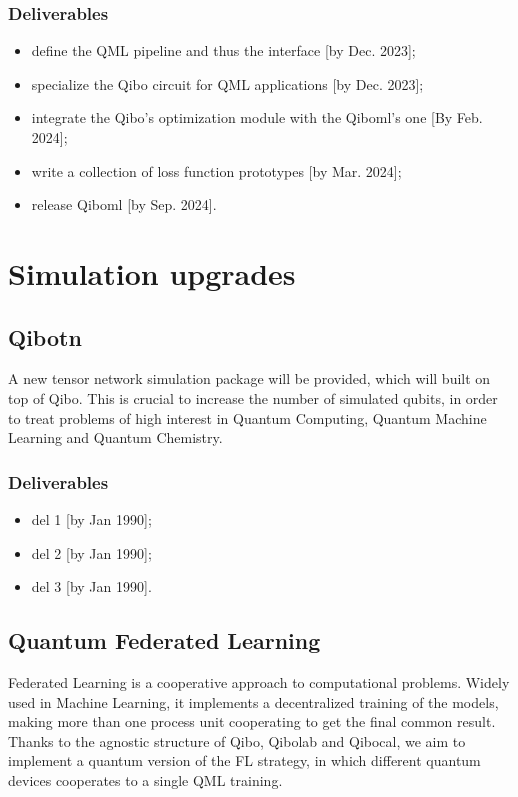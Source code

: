 \documentclass[11pt]{article}
\begin{document}
\subsubsection*{Deliverables}
\begin{itemize}[noitemsep]
\item define the QML pipeline and thus the interface [by Dec. 2023];
\item specialize the Qibo circuit for QML applications [by Dec. 2023];
\item integrate the Qibo's optimization module with the Qiboml's one [By Feb. 2024]; 
\item write a collection of loss function prototypes [by Mar. 2024];
\item release Qiboml [by Sep. 2024].
\end{itemize}

\section{Simulation upgrades}

\subsection{Qibotn}
A new tensor network simulation package will be provided, which will built on top
of Qibo. This is crucial to increase the number of simulated qubits, in order to 
treat problems of high interest in Quantum Computing, Quantum Machine Learning
and Quantum Chemistry.  


\subsubsection*{Deliverables}
\begin{itemize}[noitemsep]
\item del 1 [by Jan 1990];
\item del 2 [by Jan 1990];
\item del 3 [by Jan 1990].
\end{itemize}


\subsection{Quantum Federated Learning}
Federated Learning is a cooperative approach to computational problems. Widely 
used in Machine Learning, it implements a decentralized training of the models, 
making more than one process unit cooperating to get the final common result. 
Thanks to the agnostic structure of Qibo, Qibolab and Qibocal, we aim to implement 
a quantum version of the FL strategy, in which different quantum devices cooperates
to a single QML training. 
\end{document}
